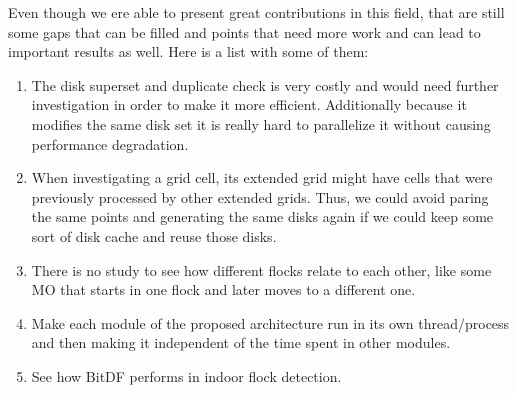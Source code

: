 Even though we ere able to present great contributions in this field, that are still some gaps that can be filled and
points that need more work and can lead to important results as well. Here is a list with some of them:

\begin{enumerate}
    \item The disk superset and duplicate check is very costly and would need further investigation in order to make it
        more efficient. Additionally because it modifies the same disk set it is really hard to parallelize it without
        causing performance degradation.
    \item When investigating a grid cell, its extended grid might have cells that were previously processed by other
        extended grids. Thus, we could avoid paring the same points and generating the same disks again if we could keep
        some sort of disk cache and reuse those disks.
    \item There is no study to see how different flocks relate to each other, like some MO that starts in one flock and
        later moves to a different one.
    \item Make each module of the proposed architecture run in its own thread/process and then making it independent of
        the time spent in other modules.
    \item See how BitDF performs in indoor flock detection.
\end{enumerate}
